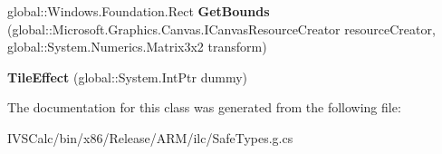 \begin{DoxyCompactItemize}
\item 
\mbox{\label{class_microsoft_1_1_graphics_1_1_canvas_1_1_effects_1_1_tile_effect_abe0663f59fe2ba4b80be6f46ca4198c8}} 
global\+::\+Windows.\+Foundation.\+Rect {\bfseries Get\+Bounds} (global\+::\+Microsoft.\+Graphics.\+Canvas.\+I\+Canvas\+Resource\+Creator resource\+Creator, global\+::\+System.\+Numerics.\+Matrix3x2 transform)
\item 
\mbox{\label{class_microsoft_1_1_graphics_1_1_canvas_1_1_effects_1_1_tile_effect_aa107fd2365bf30bb4bc757c8f23570cb}} 
{\bfseries Tile\+Effect} (global\+::\+System.\+Int\+Ptr dummy)
\end{DoxyCompactItemize}


The documentation for this class was generated from the following file\+:\begin{DoxyCompactItemize}
\item 
I\+V\+S\+Calc/bin/x86/\+Release/\+A\+R\+M/ilc/Safe\+Types.\+g.\+cs\end{DoxyCompactItemize}
